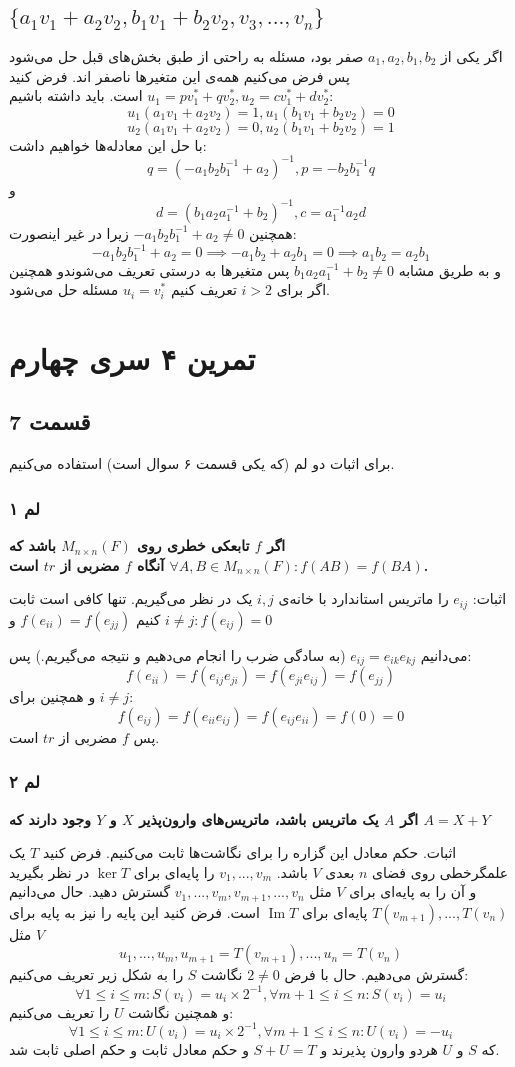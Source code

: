 \documentclass[12pt,a4paper]{article}
\DeclareMathOperator{\im}{Im}
\begin{document}
\subsection{
$\{a_1 v_1 + a_2 v_2, b_1 v_1 + b_2 v_2, v_3, ..., v_n\}$
}
اگر یکی از 
$a_1, a_2, b_1, b_2$
صفر بود، مسئله به راحتی از طبق بخش‌های قبل حل می‌شود پس فرض می‌کنیم همه‌ی این متغیرها ناصفر اند.
فرض کنید 
$u_1 = p v^*_1 + q v^*_2, u_2 = c v^*_1 + dv^*_2$
است. باید داشته باشیم:
$$
u_1(a_1 v_1 + a_2 v_2) = 1, u_1(b_1 v_1 + b_2 v_2) = 0
$$
$$
u_2(a_1 v_1 + a_2 v_2) = 0, u_2(b_1 v_1 + b_2 v_2) = 1
$$
با حل این معادله‌ها خواهیم داشت:
$$
q = (-a_1b_2b_1^{-1} + a_2)^{-1}, p = -b_2b_1^{-1}q
$$
و
$$
d = (b_1 a_2a_1^{-1} + b_2)^{-1}, c = a_1^{-1} a_2 d
$$
همچنین 
$-a_1b_2b_1^{-1} + a_2 \neq 0$
زیرا در غیر اینصورت:
$$-a_1b_2b_1^{-1} + a_2 = 0 \implies -a_1b_2 + a_2 b_1 = 0 \implies a_1b_2 = a_2b_1$$
و به طریق مشابه 
$b_1 a_2a_1^{-1} + b_2 \neq 0$
پس متغیر‌ها به درستی تعریف می‌شوندو همچنین اگر برای $i > 2$ تعریف کنیم
$u_i = v^*_i$
مسئله حل می‌شود.
\section{تمرین ۴ سری چهارم}
\subsection{قسمت 7}
برای اثبات دو لم (که یکی قسمت ۶ سوال است) استفاده می‌کنیم.
\subsubsection{لم ۱}
\textbf{
اگر $f$ تابعکی خطری روی 
$M_{n\times n}(F)$
باشد که 
$\forall A,B \in M_{n\times n}(F): f(AB) = f(BA)$
آنگاه $f$ مضربی از $tr$ است.
}

اثبات: $e_{ij}$ را ماتریس استاندارد با خانه‌ی $i, j$ یک در نظر می‌گیریم. تنها کافی است ثابت کنیم
$f(e_{ii}) = f(e_{jj})$
و
$i\neq j: f(e_{ij}) = 0$

می‌دانیم
$e_{ij} = e_{ik}e_{kj}$
(به سادگی ضرب را انجام می‌دهیم و نتیجه می‌گیریم.)
پس:
$$f(e_{ii}) = f(e_{ij}e_{ji}) = f(e_{ji}e_{ij}) = f(e_{jj})$$
و همچنین برای $i \neq j$:
$$
f(e_{ij}) = f(e_{ii}e_{ij}) = f(e_{ij}e_{ii}) = f(0) = 0
$$
پس $f$ مضربی از $tr$ است.
\subsubsection{لم ۲}
\textbf{
اگر $A$ یک ماتریس باشد، ماتریس‌های وارون‌پذیر $X$ و $Y$ وجود دارند که 
$A = X+Y$
}

اثبات. حکم معادل این گزاره را برای نگاشت‌ها ثابت می‌کنیم. فرض کنید $T$ یک علمگرخطی روی فضای $n$ بعدی $V$ باشد. 
$v_1, ..., v_m$
را پایه‌ای برای $\ker T$ در نظر بگیرید و آن‌ را به پایه‌ای برای $V$ مثل 
$v_1, ..., v_m, v_{m+1}, ..., v_n$
گسترش دهید. حال می‌دانیم 
$T(v_{m+1}), ..., T(v_n)$
پایه‌ای برای $\im T$ است. فرض کنید این پایه را نیز به پایه برای $V$ مثل
$$u_1, ..., u_m, u_{m+1} = T(v_{m+1}), ..., u_n = T(v_n)$$
گسترش می‌دهیم. حال با فرض $2 \neq 0$ نگاشت $S$ را به شکل زیر تعریف می‌کنیم:
$$\forall 1 \leq i \leq m: S(v_i) = u_i \times 2^{-1},
\forall m+1 \leq i \leq n: S(v_i) = u_i$$
و همچنین نگاشت $U$ را تعریف می‌کنیم:
$$\forall 1 \leq i \leq m: U(v_i) = u_i \times 2^{-1}, \forall m+1 \leq i \leq n: U(v_i) = -u_i$$
که $S$ و $U$ هردو وارون پذیرند و $S+U = T$ و حکم معادل ثابت و حکم اصلی ثابت شد.
\end{document}
